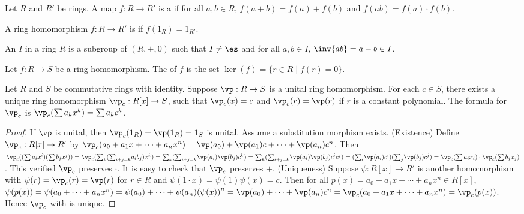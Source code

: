 \documentclass[10pt]{article}
\begin{document}
\begin{definition}
    Let $R$ and $R'$ be rings. A map $f:R\to R'$ is a  if for all $a,b\in R$, $f(a+b)=f(a)+f(b)$ and $f(ab)=f(a)\cdot f(b)$.
\end{definition}
\begin{definition}
    A ring homomorphism $f:R\to R'$ is  if $f({1}_{R})={1}_{R'}$.
\end{definition}
\begin{definition}
    An  $I$ in a ring $R$ is a subgroup of $(R,+,0)$ such that $I\ne\es$ and for all $a,b\in I$, $\inv{ab}=a-b\in I$.
\end{definition}
\begin{definition}
    Let $f:R\to S$ be a ring homomorphism. The  of $f$ is the set $\ker(f)=\{r\in R\mid f(r)=0\}$.
\end{definition}
\begin{proposition}
    Let $R$ and $S$ be commutative rings with identity. Suppose $\vp:R\to S $ is a unital ring homomorphism. For each $c\in S$, there exists a unique ring homomorphism ${\vp}_{c}:R[x]\to S$, such that ${\vp}_{c}(x)=c$ and ${\vp}_{c}(r)=\vp(r)$ if $r$ is a constant polynomial. The formula for ${\vp}_{c}$ is ${\vp}_{c}(\sum{a}_{k}{x}^{k})=\sum{a}_{k}{c}^{k}$.
\end{proposition}
\begin{proof}
    If $\vp$ is unital, then ${\vp}_{c}({1}_{R})=\vp({1}_{R})={1}_{S}$ is unital. Assume a substitution morphism exists. (Existence) Define ${\vp}_{c}:R[x]\to R'$ by ${\vp}_{c}({a}_{0}+{a}_{1}x+\cdots+{a}_{n}{x}^{n})=\vp({a}_{0})+\vp({a}_{1})c+\cdots+\vp({a}_{n}){c}^{n}$. Then ${\vp}_{c}((\sum{a}_{i}{x}^{i})(\sum{b}_{j}{x}^{j}))={\vp}_{c}({\sum}_{k}({\sum}_{i+j=k}{a}_{i}{b}_{j}){x}^{k})={\sum}_{k}({\sum}_{i+j=k}\vp({a}_{i})\vp({b}_{j}){c}^{k})={\sum}_{k}({\sum}_{i+j=k}\vp({a}_{i})\vp({b}_{j}){c}^{i}{c}^{j})=({\sum}_{i}\vp({a}_{i}){c}^{i})({\sum}_{j}\vp({b}_{j}){c}^{j})={\vp}_{c}(\sum{a}_{i}{x}_{i})\cdot{\vp}_{c}(\sum{b}_{j}{x}_{j})$. This verified ${\vp}_{c}$ preserves $\cdot$. It is easy to check that ${\vp}_{c}$ preserves $+$. (Uniqueness) Suppose $\psi:R[x]\to R'$ is another homomorphism with $\psi(r)={\vp}_{c}(r)=\vp(r)$ for $r\in R$ and $\psi(1\cdot x)= \psi(1)\psi(x)=c$. Then for all $p(x)={a}_{0}+{a}_{1}x+\cdots+{a}_{n}{x}^{n}\in R[x]$, $\psi(p(x))=\psi({a}_{0}+\cdots+{a}_{n}{x}^{n})=\psi({a}_{0})+\cdots+\psi({a}_{n}){(\psi(x))}^{n}=\vp({a}_{0})+ \cdots+\vp({a}_{n}){c}^{n}={\vp}_{c}({a}_{0}+{a}_{1}x+\cdots+{a}_{n}{x}^{n})= {\vp}_{c}(p(x))$. Hence ${\vp}_{c}$ with is unique.
\end{proof}
\end{document}
